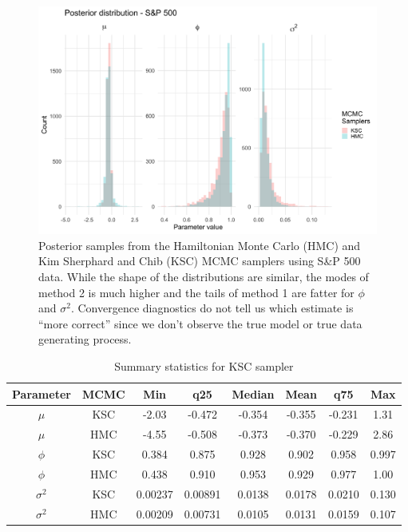 \documentclass[12pt, a4paper]{article}
\begin{document}
    \begin{figure}[h]
        \centering
        \includegraphics[scale=0.1]{motivating_example/real_data_ex.png}
        \caption{Posterior samples from the Hamiltonian Monte Carlo (HMC) and Kim Sherphard and Chib (KSC) MCMC samplers using S\&P 500 data. While the shape of the distributions are similar, the modes of method 2 is much higher and the tails of method 1 are fatter for $\phi$ and $\sigma^2$. Convergence diagnostics do not tell us which estimate is ``more correct'' since we don't observe the true model or true data generating process.}
        \label{fig:realdataex}
    \end{figure}

    \begin{table}[H]
        \centering
        \begin{tabular}{|c|c|c|c|c|c|c|c|} \hline 
        Parameter&  MCMC&Min& q25&  Median& Mean & q75&Max\\ \hline 
        $\mu$&  KSC&-2.03 & -0.472 & -0.354 & -0.355 & -0.231 & 1.31 \\
     $\mu$&  HMC&-4.55 & -0.508 & -0.373 & -0.370 & -0.229 &2.86  \\\hline 
     $\phi$&  KSC&0.384 & 0.875 & 0.928 & 0.902 & 0.958 & 0.997 \\
     $\phi$&  HMC&0.438 & 0.910 & 0.953 & 0.929 & 0.977 &1.00  \\ \hline 
     $\sigma^2$&  KSC&0.00237 & 0.00891 & 0.0138 & 0.0178 & 0.0210 & 0.130 \\ 
     $\sigma^2$&  HMC&0.00209 & 0.00731 & 0.0105 & 0.0131 & 0.0159 &0.107 \\ \hline
        \end{tabular}
        \caption{Summary statistics for KSC sampler}
        \label{tab:realdata}
    \end{table}
    
\end{document}
